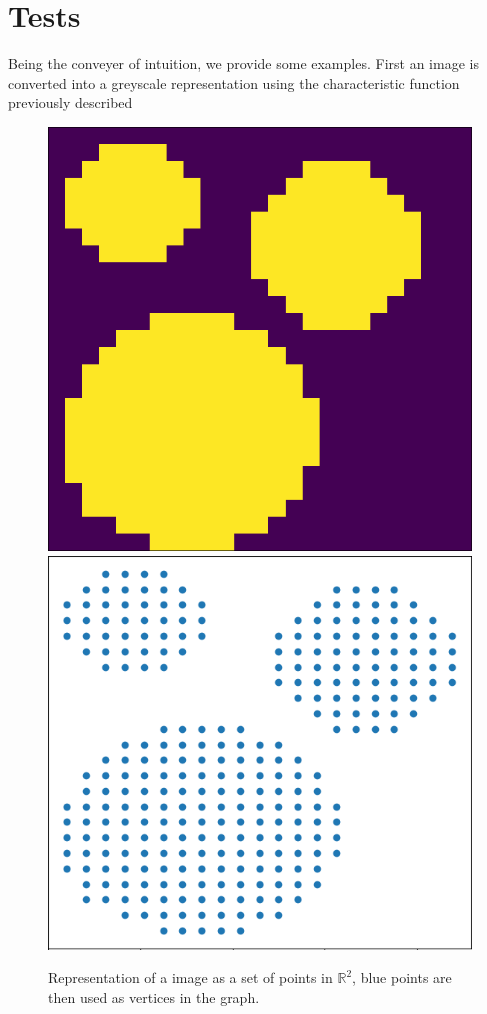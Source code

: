 \documentclass[12pt]{article}
\begin{document}
\section{Tests}

Being the conveyer of intuition, we provide some examples. First an image is converted into a greyscale representation using the characteristic function previously described 

\begin{figure}[H]
	\centering
	\includegraphics[scale=0.25]{circlepic.png}
	\hspace{2em}
	\includegraphics[scale=0.35]{circlesgraph2.png}
	\caption{Representation of a image as a set of points in $\mathbb{R}^2$, blue points are then used as vertices in the graph.}
\end{figure}
\end{document}
